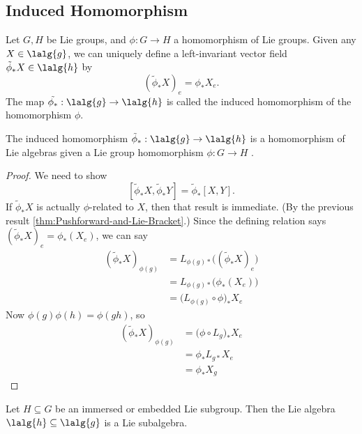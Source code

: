 \documentclass[../main.tex]{subfiles}
\begin{document}
\subsection{Induced Homomorphism}
\begin{definition}
\label{def:Induced-Homomorphism-of-Lie-Algebras}
    Let \(G, H\) be Lie groups, and \(\phi : G \to H\) a homomorphism of Lie
    groups. Given any \(X \in \lalg{g}\), we can uniquely define a
    left-invariant vector field \(\tilde{\phi}_*X \in \lalg{h}\) by
    \[
        (\tilde{\phi}_*X)_e = \phi_*X_e.
    \]
    The map \(\tilde{\phi_*} : \lalg{g} \to \lalg{h}\) is called the induced
    homomorphism of the homomorphism \(\phi\).
\end{definition}
\newpage
\begin{theorem}
\label{thm:Induced-Homomorphism-Is-a-Homomorphism}
    The induced homomorphism \(\tilde{\phi}_* : \lalg{g} \to \lalg{h}\)
    is a homomorphism of Lie algebras given a Lie group homomorphism \(\phi : G \to H\) .
\end{theorem}
\begin{proof}
    We need to show 
    \[
        [\tilde{\phi}_*X, \tilde{\phi}_*Y] = \tilde{\phi}_*[X, Y].
    \]
    If \(\tilde{\phi}_*X\) is actually \(\phi\)-related to \(X\), then that
    result is immediate. (By the previous result
    \cref{thm:Pushforward-and-Lie-Bracket}.)
    Since the defining relation says
    \((\tilde{\phi}_*X)_e = \phi_*(X_e)\), we can say
    \[
    \begin{aligned}
        (\tilde{\phi}_*X)_{\phi(g)} &=
        L_{\phi(g)*}\big((\tilde{\phi}_*X)_e\big) \\
        &= L_{\phi(g)*}\big(\phi_*(X_e)\big) \\
        &= \big(L_{\phi(g)}\circ \phi\big)_*X_e
    \end{aligned}
    \]
    Now \(\phi(g)\phi(h) = \phi(gh)\), so
    \[
    \begin{aligned}
        (\tilde{\phi}_*X)_{\phi(g)} &= \big(\phi \circ L_g\big)_*X_e \\
        &= \phi_*L_{g*}X_e \\
        &= \phi_*X_g
    \end{aligned}
    \]
\end{proof}
\begin{corollary}
\label{cor:Subgroup-has-Subalgebra}
    Let \(H \subseteq G\) be an immersed or embedded Lie subgroup. Then the Lie
    algebra \(\lalg{h} \subseteq \lalg{g}\) is a Lie subalgebra.
\end{corollary}
\end{document}
